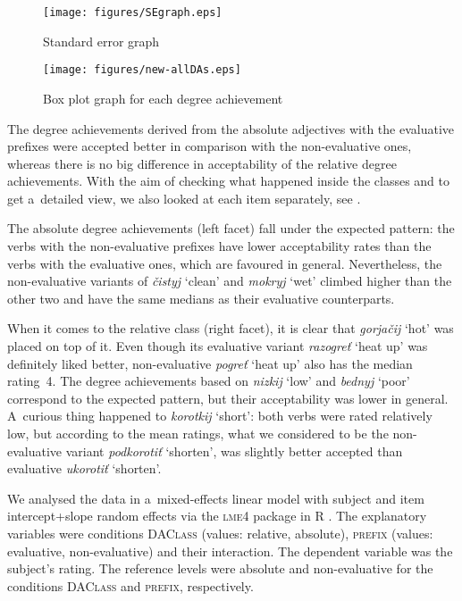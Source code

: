\documentclass[output=paper]{langscibook}
\begin{document}
\begin{figure}[p]
    \texttt{[image: figures/SEgraph.eps]}
    \caption{Standard error graph}
    \label{DA:fig:SEgraph}
\end{figure}

\begin{figure}[p]
    \texttt{[image: figures/new-allDAs.eps]}
    \caption{Box plot graph for each degree achievement}
    \label{DA:fig:allitems}
\end{figure}

The degree achievements derived from the absolute adjectives with the evaluative prefixes were accepted better in comparison with the non-evaluative ones, whereas there is no big difference in acceptability of the relative degree achievements. With the aim of checking what happened inside the classes and to get a~detailed view, we also looked at each item separately, see .

The absolute degree achievements (left facet) fall under the expected pattern: the verbs with the non-evaluative prefixes have lower acceptability rates than the verbs with the evaluative ones, which are favoured in general. Nevertheless, the non-evaluative variants of \textit{čistyj} `clean' and \textit{mokryj} `wet' climbed higher than the other two and have the same medians as their evaluative counterparts. 

When it comes to the relative class (right facet), it is clear that \textit{gorjačij} `hot' was placed on top of it. Even though its evaluative variant \textit{razogreť} `heat up' was definitely liked better, non-evaluative \textit{pogreť} `heat up' also has the median rating~4. The degree achievements based on \textit{nizkij} `low' and \textit{bednyj} `poor' correspond to the expected pattern, but their acceptability was lower in general. A~curious thing happened to \textit{korotkij} `short': both verbs were rated relatively low, but according to the mean ratings, what we considered to be the non-evaluative variant \textit{podkorotiť} `shorten', was slightly better accepted than evaluative \textit{ukorotiť} `shorten'. 

We analysed the data in a~mixed-effects linear model with subject and item intercept+slope random effects via the \textsc{lme4} package \citep{bates2015} in R \citep{r-core}. The explanatory variables were conditions \textsc{DAClass} (values: relative, absolute), \textsc{prefix} (values: evaluative, non-evaluative) and their interaction. The dependent variable was the subject's rating. The reference levels were absolute and non-evaluative for the conditions \textsc{DAClass} and \textsc{prefix}, respectively. 
\end{document}
